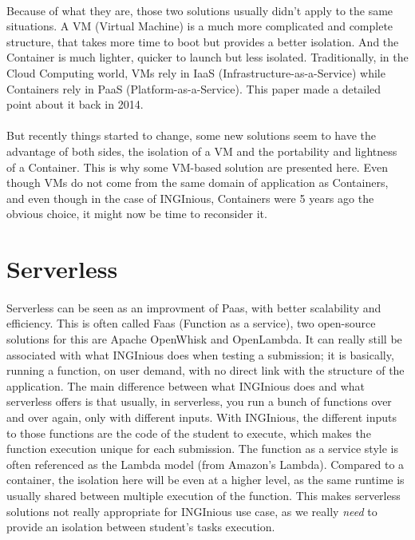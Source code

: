 \paragraph{}Because of what they are, those two solutions usually didn't apply to the same situations.  A VM (Virtual Machine) is a much more complicated and complete structure, that takes more time to boot but provides a better isolation.  And the Container is much lighter, quicker to launch but less isolated.  Traditionally, in the Cloud Computing world, VMs rely in IaaS (Infrastructure-as-a-Service) while Containers rely in PaaS (Platform-as-a-Service).  This paper \cite{dua2014virtualization} made a detailed point about it back in 2014.

\paragraph{}But recently things started to change, some new solutions seem to have the advantage of both sides, the isolation of a VM and the portability and lightness of a Container.  This is why some VM-based solution are presented here.  Even though VMs do not come from the same domain of application as Containers, and even though in the case of INGInious, Containers were 5 years ago the obvious choice, it might now be time to reconsider it.

\section{Serverless}
\paragraph{}Serverless can be seen as an improvment of Paas, with better scalability and efficiency.  This is often called Faas (Function as a service), two open-source solutions for this are Apache OpenWhisk and OpenLambda.  It can really still be associated with what INGInious does when testing a submission; it is basically, running a function, on user demand, with no direct link with the structure of the application.  The main difference between what INGInious does and what serverless offers is that usually, in serverless, you run a bunch of functions over and over again, only with different inputs.  With INGInious, the different inputs to those functions are the code of the student to execute, which makes the function execution unique for each submission.  The function as a service style is often referenced as the Lambda model (from Amazon's Lambda).  Compared to a container, the isolation here will be even at a higher level, as the same runtime is usually shared between multiple execution of the function.\cite{hendrickson2016serverless}  This makes serverless solutions not really appropriate for INGInious use case, as we really \textit{need} to provide an isolation between student's tasks execution.


